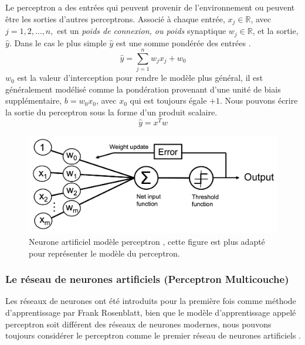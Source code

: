 	
	
	Le perceptron a des entrées qui peuvent provenir de l'environnement ou peuvent être les sorties d'autres perceptrons.
	Associé à chaque entrée, $ x_j \in \mathbb{R}$, avec $ j = 1,2, \dots , n, $ est un \textit{poids de connexion, ou poids} synaptique $w_j \in \mathbb{R}$, et la sortie, $\hat{y}$. Dans le cas le plus simple $\hat{y}$ est une somme pondérée des entrées \cite{alpaydin2010introduction}.
	$$ {\hat{y} = \sum _{j=1}^{n}w_{j}x_{j} + w_0} $$
	$w_0$ est la valeur d'interception pour rendre le modèle plus général, il est généralement modélisé comme la pondération provenant d'une unité de biais supplémentaire, $b = w_0 x_0$, avec $x_0$ qui est toujours égale $+1$. Nous pouvons écrire la sortie du perceptron sous la forme d'un produit scalaire.
	$$ \hat{y} = x^Tw $$
	
	\begin{figure}[hth]%
		\centering
		\includegraphics[width=\textwidth]{images/perceptron_neuron}
		\caption[Neurone artificiel modèle perceptron.]{Neurone artificiel modèle perceptron \cite{ml2008python}, cette figure est plus adapté pour représenter le modèle du perceptron.}
		\label{fig:perceptron_neuron}
	\end{figure}

	\subsubsection{Le réseau de neurones artificiels (Perceptron Multicouche)}
	
	Les réseaux de neurones ont été introduits pour la première fois comme méthode d'apprentissage par Frank Rosenblatt, bien que le modèle d'apprentissage appelé perceptron soit différent des réseaux de neurones modernes, nous pouvons toujours considérer le perceptron comme le premier réseau de neurones artificiels \cite{sarkar2017practical}.
	
